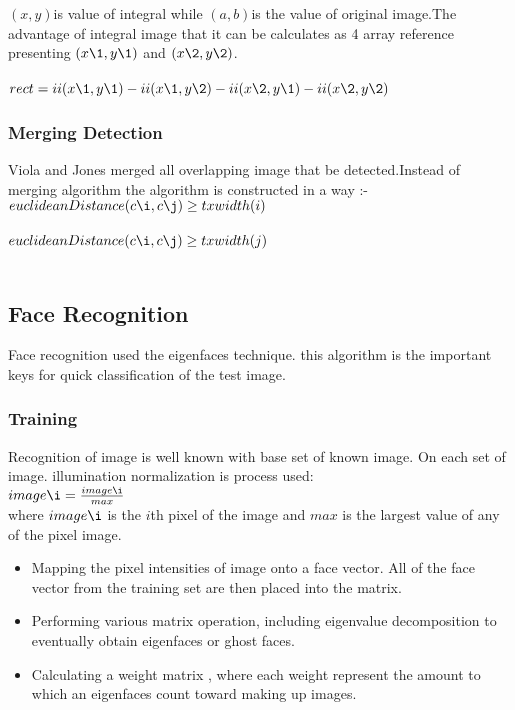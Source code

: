 \documentclass[a4paper,11pt]{article}
\begin{document}
\hspace{1cm} $(x,y)$is value of integral while $(a,b)$is the value of original image.The advantage of  integral image that it can be calculates as 4 array reference presenting $(x\1,y\1)$ and $(x\2,y\2)$.\\\\
$rect = ii(x\1,y\1)-ii(x\1,y\2)-ii(x\2,y\1)-ii(x\2,y\2)$\\
\subsubsection{Merging Detection}
\hspace{1cm} Viola and Jones merged all overlapping image that be detected.Instead of merging algorithm the algorithm is constructed in a way :-\\
$euclideanDistance (c\i,c\j) \geq t x width(i) $\\\\
$euclideanDistance (c\i,c\j) \geq t x width(j) $\\\\

\subsection{Face Recognition}
\hspace{1cm}  Face recognition  used the eigenfaces technique. this algorithm is the important keys for quick classification  of the test image.
\subsubsection{Training}
\hspace{1cm} Recognition of image is well known with  base set of known image. On each set of image. illumination normalization is process used:\\
$image\i = \frac{image\i}{max}$ \\
where $image\i$ is the $i$th pixel of the image and $max$ is the largest value of any of the pixel image.
\begin{itemize}
    \item Mapping the pixel intensities of image onto a face vector. All of the face vector from the training set are then placed into the matrix.
    \item Performing various matrix operation, including eigenvalue decomposition to eventually obtain eigenfaces or ghost faces.
    \item Calculating a weight matrix , where each weight represent the amount to which an eigenfaces count toward making up images.
\end{itemize}
\end{document}
